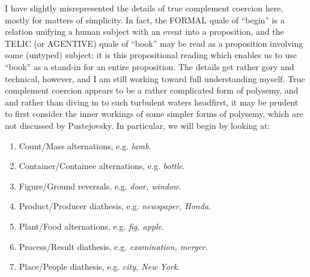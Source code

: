\documentclass[12pt]{amsart}
\begin{document}
I have slightly misrepresented the details of true complement coercion here, mostly for matters of simplicity. In fact, the FORMAL quale of ``begin'' is a relation unifying a human subject with an event into a proposition, and the TELIC (or AGENTIVE) quale of ``book'' may be read as a proposition involving some (untyped) subject; it is this propositional reading which enables us to use ``book'' as a stand-in for an entire proposition. The details get rather gory and technical, however, and I am still working toward full understanding myself. True complement coercion appears to be a rather complicated form of polysemy, and and rather than diving in to such turbulent waters headfirst, it may be prudent to first consider the inner workings of some simpler forms of polysemy, which are not discussed by Pustejovsky. In particular, we will begin by looking at:
\begin{enumerate}
\item Count/Mass alternations, e.g. \emph{lamb}.
\item Container/Containee alternations, e.g. \emph{bottle}.
\item Figure/Ground reversals, e.g. \emph{door, window}.
\item Product/Producer diathesis, e.g. \emph{newspaper, Honda}.
\item Plant/Food alternations, e.g. \emph{fig, apple}.
\item Process/Result diathesis, e.g. \emph{examination, merger}.
\item Place/People diathesis, e.g. \emph{city, New York}.
\end{enumerate}
\end{document}
